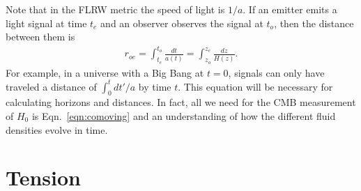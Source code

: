 \documentclass[12pt]{article}
\newcommand{\note}[1]{\textcolor{red}{#1}}
\begin{document}

Note that in the FLRW metric the speed of light is $1/a$. If an emitter emits a light signal at time $t_e$ and an observer observes the signal at $t_o$, then the distance between them is
\begin{align}
r_{oe} = \int_{t_e}^{t_o}\frac{dt}{a(t)} = \int_{z_o}^{z_e} \frac{dz}{H(z)}. \label{eqn:comoving}
\end{align}
For example, in a universe with a Big Bang at $t = 0$, signals can only have traveled a distance of $\int_0^tdt'/a$ by time $t$. This equation will be necessary for calculating horizons and distances. In fact, all we need for the CMB measurement of $H_0$ is Eqn.~\ref{eqn:comoving} and an understanding of how the different fluid densities evolve in time.


\section{Tension} \label{sec:tension}
\end{document}
